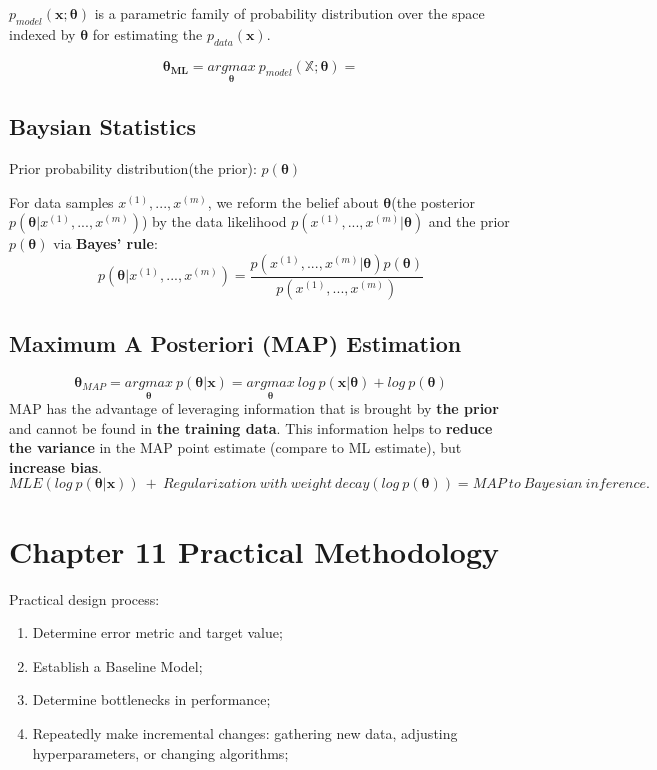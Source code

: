 \documentclass[12pt]{article}
\numberwithin{equation}{section}
\begin{document}
$p_{model}(\boldsymbol{x;\theta})$ is a parametric family of probability distribution over the space indexed by $\boldsymbol{\theta}$ for estimating the $p_{data}(\boldsymbol{x})$.

\[
\boldsymbol{\theta_{ML}}=\underset{\boldsymbol{\theta}}{argmax}\ p_{model}({\mathbb{X};\boldsymbol{\theta}})=
\]

\subsection{Baysian Statistics}
Prior probability distribution(the prior): $p(\boldsymbol\theta)$

For data samples ${x^{(1)},...,x^{(m)}}$, we reform the belief about $\boldsymbol\theta$(the posterior$p(\boldsymbol\theta|x^{(1)},...,x^{(m)})$) by the data likelihood $p(x^{(1)},...,x^{(m)}|\boldsymbol\theta)$ and the prior $p(\boldsymbol\theta)$ via \textbf{Bayes' rule}: \[
p(\boldsymbol\theta|x^{(1)},...,x^{(m)})=\frac{p(x^{(1)},...,x^{(m)}|\boldsymbol\theta)p(\boldsymbol\theta)}{p(x^{(1)},...,x^{(m)})}
\]

\subsection{Maximum A Posteriori (MAP) Estimation}
\[
\boldsymbol\theta_{MAP}=\underset{\boldsymbol\theta}{argmax} \  p(\boldsymbol{\theta|x})=\underset{\boldsymbol\theta}{argmax} \ log \  p(\boldsymbol{x|\theta})+log\ p(\boldsymbol{\theta})
\]
MAP has the advantage of leveraging information that is brought by \textbf{the prior} and cannot be found in \textbf{the training data}. This information helps to \textbf{reduce the variance} in the MAP point estimate (compare to ML estimate), but \textbf{increase bias}.
\[
MLE(log\ p(\boldsymbol{\theta|x})) \ + \ Regularization\ with\ weight\ decay(log\ p(\boldsymbol{\theta})) = MAP \  to \ Bayesian \ inference.
\]

\section{Chapter 11 Practical Methodology}
Practical design process:
\begin{enumerate}
	\item Determine error metric and target value;
	\item Establish a Baseline Model;
	\item Determine bottlenecks in performance;
	\item Repeatedly make incremental changes: gathering new data, adjusting hyperparameters, or changing algorithms;
\end{enumerate}
\end{document}
